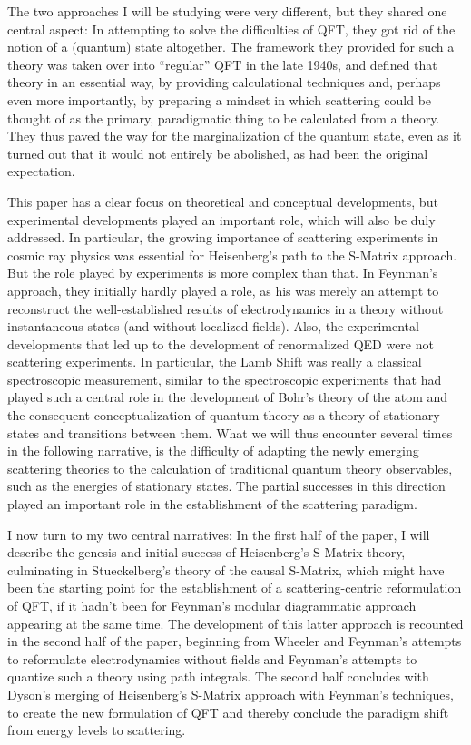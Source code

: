 \documentclass[12pt]{article}
\begin{document}
The two approaches I will be studying were very different, but they shared one central aspect: In attempting to solve the difficulties of QFT, they got rid of the notion of a (quantum) state altogether. The framework they provided for such a theory was taken over into ``regular'' QFT in the late 1940s, and defined that theory in an essential way, by providing calculational techniques and, perhaps even more importantly, by preparing a mindset in which scattering could be thought of as the primary, paradigmatic thing to be calculated from a theory. They thus paved the way for the marginalization of the quantum state, even as it turned out that it would not entirely be abolished, as had been the original expectation.

This paper has a clear focus on theoretical and conceptual developments, but experimental developments played an important role, which will also be duly addressed. In particular, the growing importance of scattering experiments in cosmic ray physics was essential for Heisenberg's path to the S-Matrix approach. But the role played by experiments is more complex than that. In Feynman's approach, they initially hardly played a role, as his was merely an attempt to reconstruct the well-established results of electrodynamics in a theory without instantaneous states (and without localized fields). Also, the experimental developments that led up to the development of renormalized QED were not scattering experiments. In particular, the Lamb Shift was really a classical spectroscopic measurement, similar to the spectroscopic experiments that had played such a central role in the development of Bohr's theory of the atom and the consequent conceptualization of quantum theory as a theory of stationary states and transitions between them. What we will thus encounter several times in the following narrative, is the difficulty of adapting the newly emerging scattering theories to the calculation of traditional quantum theory observables, such as the energies of stationary states. The partial successes in this direction played an important role in the establishment of the scattering paradigm.

I now turn to my two central narratives: In the first half of the paper, I will describe the genesis and initial success of Heisenberg's S-Matrix theory, culminating in Stueckelberg's theory of the causal S-Matrix, which might have been the starting point for the establishment of a scattering-centric reformulation of QFT, if it hadn't been for Feynman's modular diagrammatic approach appearing at the same time. The development of this latter approach is recounted in the second half of the paper, beginning from Wheeler and Feynman's attempts to reformulate electrodynamics without fields and Feynman's attempts to quantize such a theory using path integrals. The second half concludes with Dyson's merging of Heisenberg's S-Matrix approach with Feynman's techniques, to create the new formulation of QFT and thereby conclude the paradigm shift from energy levels to scattering.
\end{document}
